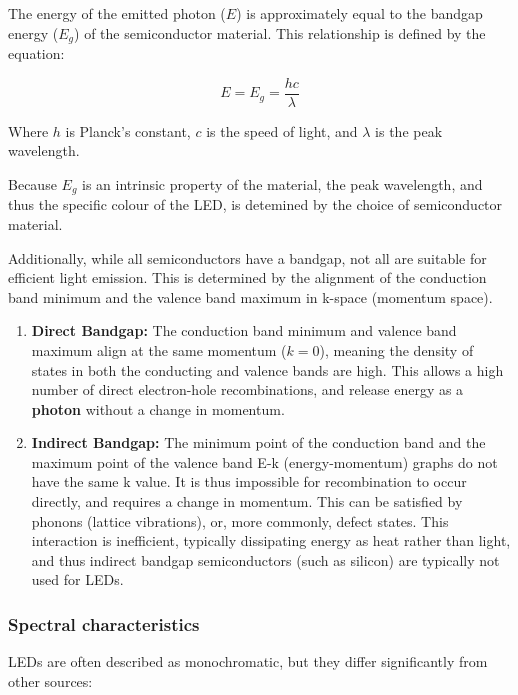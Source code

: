\documentclass[1pt]{article}
\begin{document}
The energy of the emitted photon ($E$) is approximately equal to the bandgap energy ($E_g$) of the semiconductor material. This relationship is defined by the equation:

\begin{equation}
    \label{photon-energy}
    E = E_g = \frac{hc}{\lambda}
\end{equation}

Where $h$ is Planck's constant, $c$ is the speed of light, and $\lambda$ is the peak wavelength.

Because $E_g$ is an intrinsic property of the material, the peak wavelength, and thus the specific colour of the LED, is detemined by the choice of semiconductor material.

Additionally, while all semiconductors have a bandgap, not all are suitable for efficient light emission. This is determined by the alignment of the conduction band minimum and the valence band maximum in k-space (momentum space).

\begin{enumerate}
\item \textbf{Direct Bandgap:} The conduction band minimum and valence band maximum align at the same momentum ($k=0$), meaning the density of states in both the conducting and valence bands are high. This allows a high number of direct electron-hole recombinations, and release energy as a \textbf{photon} without a change in momentum.
    \vspace{-0.3\baselineskip}
\item \textbf{Indirect Bandgap:} The minimum point of the conduction band and the maximum point of the valence band E-k (energy-momentum) graphs do not have the same k value. It is thus impossible for recombination to occur directly, and requires a change in momentum. This can be satisfied by phonons (lattice vibrations), or, more commonly, defect states. This interaction is inefficient, typically dissipating energy as heat rather than light, and thus indirect bandgap semiconductors (such as silicon) are typically not used for LEDs.
\end{enumerate}

\subsubsection{Spectral characteristics}

LEDs are often described as monochromatic, but they differ significantly from other sources:
\end{document}
